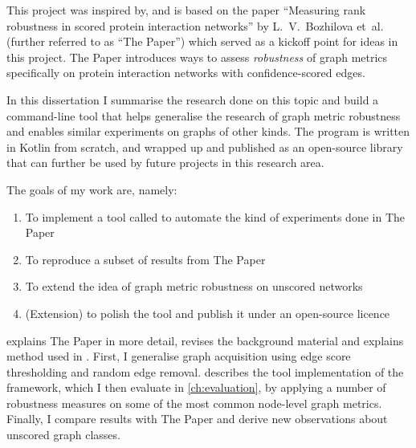 This project was inspired by, and is based on the paper ``Measuring rank robustness in scored protein interaction networks'' by L.~V.~Bozhilova et~al.~\cite{Bozhilova2019} (further referred to as ``The Paper'') which served as a kickoff point for ideas in this project.
The Paper introduces ways to assess \textsl{robustness} of graph metrics specifically on protein interaction networks with confidence-scored edges.

In this dissertation I summarise the research done on this topic and build a command-line tool \graffs that helps generalise the research of graph metric robustness and enables similar experiments on graphs of other kinds.
The program is written in Kotlin from scratch, and wrapped up and published as an open-source library that can further be used by future projects in this research area.

The goals of my work are, namely:
\begin{enumerate}[noitemsep,topsep=5pt]
    \item To implement a tool called \graffs to automate the kind of experiments done in The Paper
    \item To reproduce a subset of results from The Paper
    \item To extend the idea of graph metric robustness on unscored networks
    \item (Extension) to polish the tool and publish it under an open-source licence
\end{enumerate}

 explains The Paper in more detail, revises the background material and explains method used in \graffs.
First, I generalise graph acquisition using edge score thresholding and random edge removal.
 describes the tool implementation of the framework, which I then evaluate in \cref{ch:evaluation}, by applying a number of robustness measures on some of the most common node-level graph metrics.
Finally, I compare results with The Paper and derive new observations about unscored graph classes.
